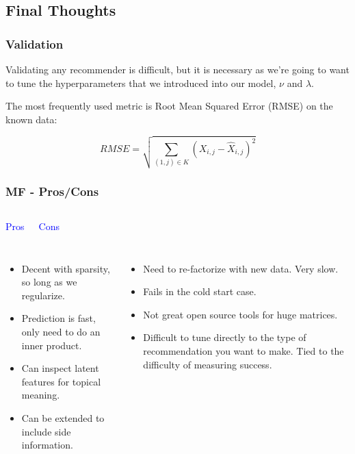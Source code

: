 \documentclass{beamer}
\begin{document}
\subsection{Final Thoughts}
\begin{frame}
  \frametitle{Validation}
  Validating any recommender is difficult, but it is necessary as we're going to want to tune the hyperparameters that we introduced into our model, $\nu$ and $\lambda$. \vspace{2mm}
  
  The most frequently used metric is Root Mean Squared Error (RMSE) on the known data:

  $$ RMSE = \sqrt{\sum\limits_{(1,j) \in K} (X_{i,j} - \hat{X}_{i,j})^2} $$
\end{frame}

\begin{frame}
  \frametitle{MF - Pros/Cons}
  \begin{columns}
    \begin{center} {\LARGE \textcolor{blue}{Pros}} \end{center}
    \begin{center} {\LARGE \textcolor{blue}{Cons}} \end{center}
  \end{columns} \vspace{4mm}
  \begin{columns}
    \begin{itemize}
      \item Decent with sparsity, so long as we regularize.
      \item Prediction is fast, only need to do an inner product.
      \item Can inspect latent features for topical meaning.
      \item Can be extended to include side information.
    \end{itemize}
    \begin{itemize}
      \item Need to re-factorize with new data. Very slow.
      \item Fails in the cold start case.
      \item Not great open source tools for huge matrices.
      \item Difficult to tune directly to the type of recommendation you want to make. Tied to the difficulty of measuring success.
    \end{itemize}
  \end{columns}
\end{frame}
\end{document}
